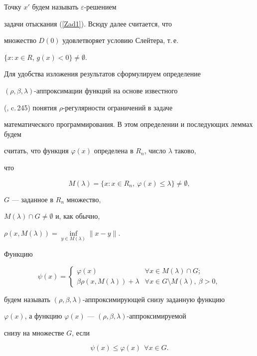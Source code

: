 Точку $x'$ будем называть $\varepsilon$-решением 


задачи отыскания (\ref{Zad1}). Всюду далее считается, что


множество $D(0)$ удовлетворяет условию Слейтера, т.\,е.


$\{x: x\in R$, $g(x)<0\}\ne\emptyset$.





Для удобства изложения результатов сформулируем определение


$(\rho,\beta,\lambda)$-аппроксимации функций на основе известного


(\cite{STF}, c.\,245) понятия $\rho$-регулярности ограничений в задаче


математического программирования. В этом определении и последующих леммах будем


считать, что функция $\varphi(x)$ определена в $R_n$, число $\lambda$ таково,


что


$$


M(\lambda)=\{x:x\in R_n,\ \varphi(x)\leq\lambda\}\ne\emptyset,


$$


$G$ --- заданное в $R_n$ множество,


$M(\lambda)\cap G\ne\emptyset$ и, как обычно,


$\rho(x, M(\lambda))=\inf\limits_{y\in M(\lambda)}\|x-y\|$.





\begin{defnnonum}


Функцию


\begin{equation}\label{phi1}


\psi(x)=\begin{cases}


\varphi(x) & \forall x\in M(\lambda)\cap G;\\


\beta\rho(x,M(\lambda))+\lambda & \forall x\in G\setminus M(\lambda),\ \beta>0,


\end{cases}


\end{equation}


будем называть $(\rho,\beta,\lambda)$-аппроксимирующей снизу заданную функцию


$\varphi(x)$, а функцию $\varphi(x)$ --- $(\rho,\beta,\lambda)$-аппроксимируемой


снизу на множестве $G$, если


\begin{equation}\label{psi1}


\psi(x)\leq\varphi(x) \ \ \forall x\in G.


\end{equation}


\end{defnnonum}








